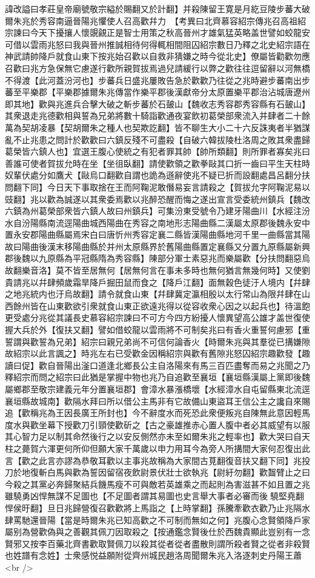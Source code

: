 諱改謚曰孝莊皇帝廟號敬宗縊於賜翻又於計翻】并殺陳留王寛是月紇豆陵步蕃大破爾朱兆於秀容南逼晉陽兆懼使人召高歡幷力　【考異曰北齊慕容紹宗傳兆召高祖紹宗諫曰今天下擾攘人懷覬覦正是智士用策之秋高晉州才雄氣猛英略盖世譬如蛟龍安可借以雲雨兆怒曰我與晉州推誠相待何得輒相間阻囚紹宗數日乃釋之北史紹宗語在神武請帥降戶就食山東下按兆始召歡以自救非猜嫌之時今從北史】僚屬皆勸歡勿應召歡曰兆方急保無它慮遂行歡所親賀拔焉過兒請緩行以弊之歡往往逗留辭以河無橋不得渡【此河蓋汾河也】步蕃兵日盛兆屢敗告急於歡歡乃往從之兆時避步蕃南出步蕃至平樂郡【平樂郡據爾朱兆傳當作樂平郡後漢獻帝分太原置樂平郡治沾城唐遼州即其地】歡與兆進兵合擊大破之斬步蕃於石皷山【魏收志秀容郡秀容縣有石皷山】其衆退走兆德歡相與誓為兄弟將數十騎詣歡通夜宴飲初葛榮部衆流入并肆者二十餘萬為契胡凌暴【契胡爾朱之種人也契欺訖翻】皆不聊生大小二十六反誅夷者半猶謀亂不止兆患之問計於歡歡曰六鎮反殘不可盡殺【自破六韓拔陵杜洛周之敗其衆盡歸葛榮皆六鎮人也】宜選王腹心使統之有犯者罪其帥【帥所類翻】則所罪者寡矣兆曰善誰可使者賀拔允時在坐【坐徂臥翻】請使歡領之歡拳敺其口折一齒曰平生天柱時奴輩伏處分如鷹犬【敺烏口翻歡自謂也詭為遜辭使兆不疑已折而設翻處昌呂翻分扶問翻下同】今日天下事取捨在王而阿鞠泥敢僭易妄言請殺之【賀拔允字阿鞠泥易以豉翻】兆以歡為誠遂以其衆委焉歡以兆醉恐醒而悔之遂出宣言受委統州鎮兵【魏改六鎮為州葛榮部衆皆六鎮人故曰州鎮兵】可集汾東受號令乃建牙陽曲川【水經注汾水自汾陽縣南流逕陽曲城西陽曲在秀容之南地形志陽曲縣二漢屬太原郡後魏永安中置永安郡陽曲縣屬焉宋白曰唐忻州秀容定襄二縣皆漢陽曲縣地河千里一曲縣當其陽故曰陽曲後漢末移陽曲縣於并州太原縣界於舊陽曲縣置定襄縣又分置九原縣屬新興郡後魏以九原縣為平冠縣隋為秀容縣】陳部分軍士素惡兆而樂屬歡【分扶問翻惡烏故翻樂音洛】莫不皆至居無何【居無何言在事未多時也無何猶言無幾何時】又使劉貴請兆以幷肆頻歲霜旱降戶掘田鼠而食之【降戶江翻】面無穀色徒汙人境内【幷肆之地兆統内也汙烏故翻】請令就食山東【幷肆冀定瀛相殷以太行常山為限幷肆在山西餘州皆在山東歡欲引衆就食山東正欲遠兆得以從容收衆心因之以起兵也】待溫飽更受處分兆從其議長史慕容紹宗諫曰不可方今四方紛擾人懷異望高公雄才盖世復使握大兵於外【復扶又翻】譬如借蛟龍以雲雨將不可制矣兆曰有香火重誓何慮邪【重誓謂與歡誓為兄弟】紹宗曰親兄弟尚不可信何論香火【時爾朱兆與其羣從已搆嫌隙故紹宗以此言諷之】時兆左右已受歡金因稱紹宗與歡有舊隙兆怒囚紹宗趣歡發【趣讀曰促】歡自晉陽出滏口道逢北鄉長公主自洛陽來有馬三百匹盡奪而易之兆聞之乃釋紹宗而問之紹宗曰此猶是掌握中物也兆乃自追歡至襄垣【襄垣縣漢屬上黨即後魏屬鄉郡至敬宗建義元年分置襄垣郡】會漳水暴漲橋壞【水經漳水自屯留縣東北流逕襄垣縣故城南】歡隔水拜曰所以借公主馬非有它故備山東盜耳王信公主之讒自來賜追【歡稱兆為王因長廣王所封也】今不辭度水而死恐此衆便叛兆自陳無此意因輕馬度水與歡坐幕下授歡刀引頸使歡斫之【古之豪雄推赤心置人腹中者必其威望有以服其心智力足以制其命然後行之以安反側然亦未至如爾朱兆之輕率也】歡大哭曰自天柱之薨賀六渾更何所仰但願大家千萬歲以申力用耳今為旁人所搆間大家何忍復出此言【歡之此言亦謬為恭敬耳歡以主事兆故稱為大家間古莧翻復音扶又翻下同】兆投刀於地復斬白馬與歡為誓因留宿夜飲尉景伏壯士欲執兆【尉紆勿翻】歡齧臂止之曰今殺之其黨必奔歸聚結兵饑馬瘦不可與敵若英雄乘之而起則為害滋甚不如且置之兆雖驍勇凶悍無謀不足圖也【不足圖者謂其易圖也史言舉大事者必審而後驍堅堯翻悍侯旴翻】旦日兆歸營復召歡歡將上馬詣之【上時掌翻】孫騰牽歡衣歡乃止兆隔水肆罵馳還晉陽【當是時爾朱兆已知高歡之不可制而無如之何】兆腹心念賢領降戶家屬别為營歡偽與之善觀其佩刀因取殺之【按通鑑念賢後仕於西魏貴顯此豈别有一念賢邪又按李百藥北齊書歡取賢佩刀以殺其從者從者盡散則謂所殺者賢之從者非殺賢也姓譜有念姓】士衆感悦益願附從齊州城民趙洛周聞爾朱兆入洛逐刺史丹陽王蕭<br />
